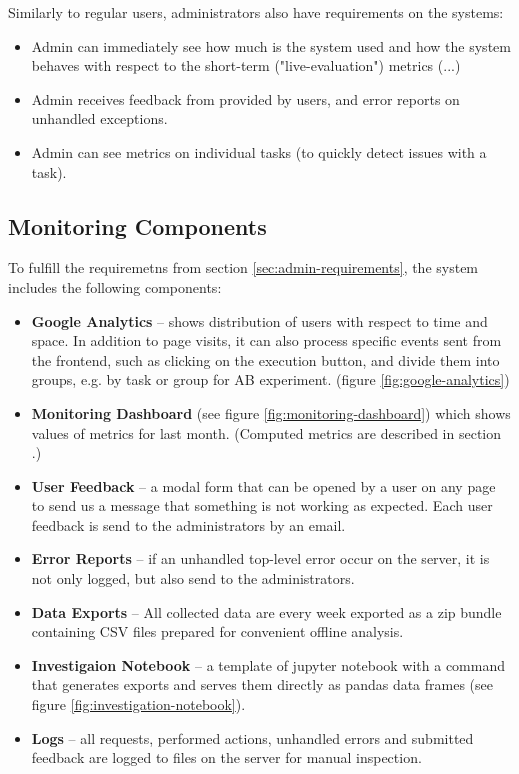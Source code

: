 Similarly to regular users, administrators also have requirements on the systems:

\begin{itemize}
\item Admin can immediately see how much is the system used and how the system behaves with respect to the short-term ("live-evaluation") metrics (...)
\item Admin receives feedback from provided by users, and error reports on unhandled exceptions.
\item Admin can see metrics on individual tasks (to quickly detect issues with a task).
\end{itemize}


\subsection{Monitoring Components}

To fulfill the requiremetns from section \ref{sec:admin-requirements},
the system includes the following components:

\begin{itemize}
\item \textbf{Google Analytics} --
  shows distribution of users with respect to time and space.
  In addition to page visits,
  it can also process specific events sent from the frontend,
  such as clicking on the execution button,
  and divide them into groups, e.g. by task or group for AB experiment.
  (figure \ref{fig:google-analytics})
\item \textbf{Monitoring Dashboard} (see figure \ref{fig:monitoring-dashboard})
      which shows values of metrics for last month.
      (Computed metrics are described in section \label{sec:robomission.metrics}.)
\item \textbf{User Feedback} --
  a modal form that can be opened by a user on any page
  to send us a message that something is not working as expected.
  Each user feedback is send to the administrators by an email.
\item \textbf{Error Reports} --
  if an unhandled top-level error occur on the server,
  it is not only logged, but also send to the administrators.
\item \textbf{Data Exports} --
  All collected data are every week exported as a zip bundle containing
  CSV files prepared for convenient offline analysis.
\item \textbf{Investigaion Notebook} --
  a template of jupyter notebook with a command that generates exports
  and serves them directly as pandas data frames
  (see figure \ref{fig:investigation-notebook}).
\item \textbf{Logs} --
  all requests, performed actions, unhandled errors and submitted feedback are logged
  to files on the server for manual inspection.
\end{itemize}


